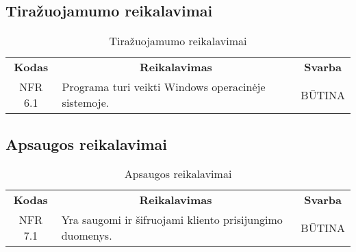 \documentclass{VUMIFPSkursinis}
\begin{document}
\subsection{Tiražuojamumo reikalavimai}
\begin{center}
	\begin{table}[H]
	\begin{tabular}{|p{2cm}|p{}|p{}|}
	\hline
	    \rowcolor{lightgray}
		\multicolumn{3}{|c|}{Tiražuojamumo reikalavimai}\\
		
	\hline
		\multicolumn{1}{|c|}{{\bfseries Kodas}}&
		\multicolumn{1}{|c|}{{\bfseries Reikalavimas}}&
		\multicolumn{1}{|c|}{{\bfseries Svarba}}\\
	\hline 	
		\multicolumn{1}{|c|}{NFR 6.1}&
		{Programa turi veikti Windows operacinėje sistemoje.}&
		\multicolumn{1}{|c|}{BŪTINA}\\	
	
	\hline 	
	\end{tabular}
	\caption{Tiražuojamumo reikalavimai}
	\label{table:Tiražuojamumoreikalavimai}
	\end{table}

\end{center}

\subsection{Apsaugos reikalavimai}
\begin{center}
	\begin{table}[H]
	\begin{tabular}{|p{2cm}|p{}|p{}|}
	\hline
	    \rowcolor{lightgray}
		\multicolumn{3}{|c|}{Apsaugos reikalavimai}\\
		
	\hline
		\multicolumn{1}{|c|}{{\bfseries Kodas}}&
		\multicolumn{1}{|c|}{{\bfseries Reikalavimas}}&
		\multicolumn{1}{|c|}{{\bfseries Svarba}}\\
	\hline 	
		\multicolumn{1}{|c|}{NFR 7.1}&
		{Yra saugomi ir šifruojami kliento prisijungimo duomenys.}&
		\multicolumn{1}{|c|}{BŪTINA}\\	
	
	\hline 	
	\end{tabular}
	\caption{Apsaugos reikalavimai}
	\label{table:Apsaugosreikalavimai}
	\end{table}

\end{center}
\end{document}
